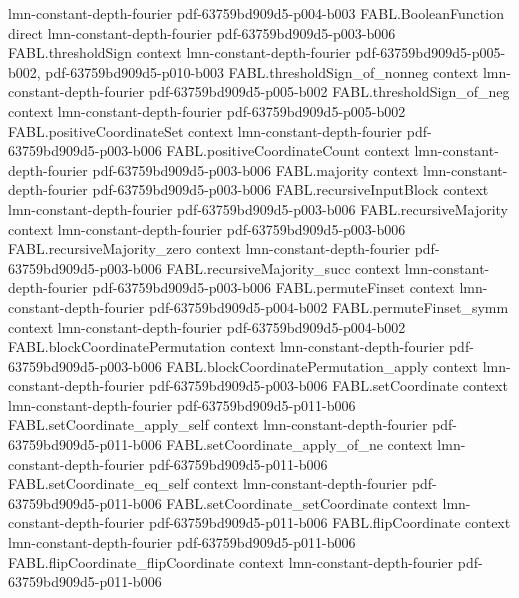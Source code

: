 \begin{theorem}
  {lmn-constant-depth-fourier}
  {pdf-63759bd909d5-p004-b003}
\proofstep
  {FABL.BooleanFunction}
  {direct}
  {lmn-constant-depth-fourier}
  {pdf-63759bd909d5-p003-b006}
\proofstep
  {FABL.thresholdSign}
  {context}
  {lmn-constant-depth-fourier}
  {pdf-63759bd909d5-p005-b002,
    pdf-63759bd909d5-p010-b003}
\proofstep
  {FABL.thresholdSign_of_nonneg}
  {context}
  {lmn-constant-depth-fourier}
  {pdf-63759bd909d5-p005-b002}
\proofstep
  {FABL.thresholdSign_of_neg}
  {context}
  {lmn-constant-depth-fourier}
  {pdf-63759bd909d5-p005-b002}
\proofstep
  {FABL.positiveCoordinateSet}
  {context}
  {lmn-constant-depth-fourier}
  {pdf-63759bd909d5-p003-b006}
\proofstep
  {FABL.positiveCoordinateCount}
  {context}
  {lmn-constant-depth-fourier}
  {pdf-63759bd909d5-p003-b006}
\proofstep
  {FABL.majority}
  {context}
  {lmn-constant-depth-fourier}
  {pdf-63759bd909d5-p003-b006}
\proofstep
  {FABL.recursiveInputBlock}
  {context}
  {lmn-constant-depth-fourier}
  {pdf-63759bd909d5-p003-b006}
\proofstep
  {FABL.recursiveMajority}
  {context}
  {lmn-constant-depth-fourier}
  {pdf-63759bd909d5-p003-b006}
\proofstep
  {FABL.recursiveMajority_zero}
  {context}
  {lmn-constant-depth-fourier}
  {pdf-63759bd909d5-p003-b006}
\proofstep
  {FABL.recursiveMajority_succ}
  {context}
  {lmn-constant-depth-fourier}
  {pdf-63759bd909d5-p003-b006}
\proofstep
  {FABL.permuteFinset}
  {context}
  {lmn-constant-depth-fourier}
  {pdf-63759bd909d5-p004-b002}
\proofstep
  {FABL.permuteFinset_symm}
  {context}
  {lmn-constant-depth-fourier}
  {pdf-63759bd909d5-p004-b002}
\proofstep
  {FABL.blockCoordinatePermutation}
  {context}
  {lmn-constant-depth-fourier}
  {pdf-63759bd909d5-p003-b006}
\proofstep
  {FABL.blockCoordinatePermutation_apply}
  {context}
  {lmn-constant-depth-fourier}
  {pdf-63759bd909d5-p003-b006}
\proofstep
  {FABL.setCoordinate}
  {context}
  {lmn-constant-depth-fourier}
  {pdf-63759bd909d5-p011-b006}
\proofstep
  {FABL.setCoordinate_apply_self}
  {context}
  {lmn-constant-depth-fourier}
  {pdf-63759bd909d5-p011-b006}
\proofstep
  {FABL.setCoordinate_apply_of_ne}
  {context}
  {lmn-constant-depth-fourier}
  {pdf-63759bd909d5-p011-b006}
\proofstep
  {FABL.setCoordinate_eq_self}
  {context}
  {lmn-constant-depth-fourier}
  {pdf-63759bd909d5-p011-b006}
\proofstep
  {FABL.setCoordinate_setCoordinate}
  {context}
  {lmn-constant-depth-fourier}
  {pdf-63759bd909d5-p011-b006}
\proofstep
  {FABL.flipCoordinate}
  {context}
  {lmn-constant-depth-fourier}
  {pdf-63759bd909d5-p011-b006}
\proofstep
  {FABL.flipCoordinate_flipCoordinate}
  {context}
  {lmn-constant-depth-fourier}
  {pdf-63759bd909d5-p011-b006}

\end{theorem}
